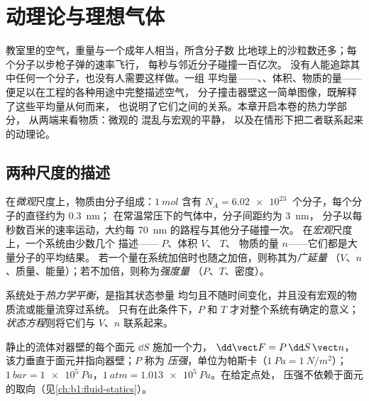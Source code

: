 \chapter{动理论与理想气体}\label{ch:b1:kinetic-theory}

教室里的空气，重量与一个成年人相当，所含分子数
比地球上的沙粒数还多；每个分子以步枪子弹的速率飞行，
每秒与邻近分子碰撞一百亿次。
没有人能追踪其中任何一个分子，也没有人需要这样做。一组
平均量——、、体积、物质的量——
便足以在工程的各种用途中完整描述空气，
分子撞击器壁这一简单图像，既解释了这些平均量从何而来，
也说明了它们之间的关系。本章开启本卷的热力学部分，
从两端来看物质：微观的
混乱与宏观的平静，
以及在情形下把二者联系起来的动理论。

\section{两种尺度的描述}

\begin{definition}[微观尺度与宏观尺度]\label{def:b1:kinetic-theory:scales}
在\emph{微观}尺度上，物质由分子组成：$\qty{1}{mol}$
含有 $N_A = \qty{6.02e23}{}$ 个分子，每个分子的直径约为 \qty{0.3}{nm}；
在常温常压下的气体中，分子间距约为 \qty{3}{nm}，
分子以每秒数百米的速率运动，大约每 \qty{70}{nm} 的路程与其他分子碰撞一次。
在\emph{宏观}尺度上，一个系统由少数几个
\emph{}描述—— $P$、体积 $V$、 $T$、
物质的量 $n$——它们都是大量分子的平均结果。
若一个量在系统加倍时也随之加倍，则称其为\emph{广延量}
（$V$、$n$、质量、能量）；若不加倍，则称为\emph{强度量}
（$P$、$T$、密度）。
\end{definition}

\begin{definition}[热力学平衡]\label{def:b1:kinetic-theory:equilibrium}
系统处于\emph{热力学平衡}，是指其状态参量
均匀且不随时间变化，并且没有宏观的物质流或能量流穿过系统。
只有在此条件下，$P$ 和 $T$ 才对整个系统有确定的意义；
\emph{状态方程}则将它们与 $V$、$n$ 联系起来。
\end{definition}

\begin{definition}[压强]\label{def:b1:kinetic-theory:pressure}
静止的流体对器壁的每个面元 $\dd S$ 施加一个力，
$\dd\vect F = P\,\dd S\,\vect n$，该力垂直于面元并指向器壁；$P$ 称为
\emph{压强}，单位为帕斯卡（$\qty{1}{Pa} = \qty{1}{N/m^2}$）；$\qty{1}{bar}
= \qty{1e5}{Pa}$，$\qty{1}{atm} = \qty{1.013e5}{Pa}$。在给定点处，
压强不依赖于面元的取向（见\cref{ch:b1:fluid-statics}）。
\end{definition}

